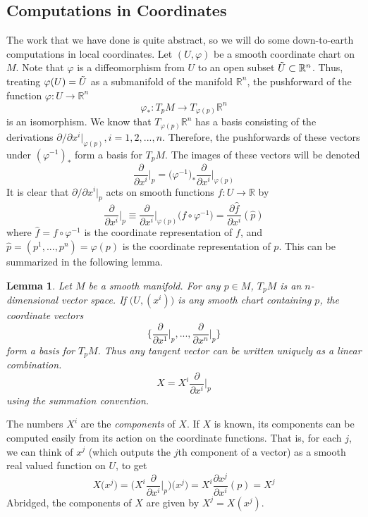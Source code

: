 \documentclass{article}
\newtheorem{lemma}[theorem]{Lemma}
\theoremstyle{remark}
\theoremstyle{definition}
\begin{document}
\subsection{Computations in Coordinates}
The work that we have done is quite abstract, so we will do some down-to-earth computations in local coordinates. Let $(U, \varphi)$ be a smooth coordinate chart on $M$. Note that $\varphi$ is a diffeomorphism from $U$ to an open subset $\Tilde{U} \subset \mathbb{R}^n$. Thus, treating $\varphi(U) = \Tilde{U}$ as a submanifold of the manifold $\mathbb{R}^n$, the pushforward of the function $\varphi: U \longrightarrow \mathbb{R}^n$
\[\varphi_* : T_p M \longrightarrow T_{\varphi(p)} \mathbb{R}^n\]
is an isomorphism. We know that $T_{\varphi(p)} \mathbb{R}^n$ has a basis consisting of the derivations $\partial /\partial x^i \big|_{\varphi(p)}, i = 1, 2, ..., n$. Therefore, the pushforwards of these vectors under $(\varphi^{-1})_*$ form a basis for $T_p M$. The images of these vectors will be denoted
\[\frac{\partial}{\partial x^i} \bigg|_p = \big( \varphi^{-1} \big)_* \frac{\partial}{\partial x^i} \bigg|_{\varphi(p)}\]
It is clear that $\partial / \partial x^i \big|_p $ acts on smooth functions $f: U \longrightarrow \mathbb{R}$ by
\[\frac{\partial}{\partial x^i} \bigg|_p \equiv \frac{\partial}{\partial x^i} \bigg|_{\varphi(p)} \big( f \circ \varphi^{-1} \big) = \frac{\partial \hat{f}}{\partial x^i} (\hat{p})\]
where $\hat{f} = f \circ \varphi^{-1}$ is the coordinate representation of $f$, and $\hat{p} = (p^1, ..., p^n) = \varphi(p)$ is the coordinate representation of $p$. This can be summarized in the following lemma. 

\begin{lemma}
Let $M$ be a smooth manifold. For any $p \in M$, $T_p M$ is an $n$-dimensional vector space. If $\big( U, (x^i)\big)$ is any smooth chart containing $p$, the coordinate vectors 
\[\bigg\{ \frac{\partial}{\partial x^1} \bigg|_p, ..., \frac{\partial}{\partial x^n} \bigg|_p \bigg\}\]
form a basis for $T_p M$. Thus any tangent vector can be written uniquely as a linear combination. 
\[X = X^i \frac{\partial}{\partial x^i} \bigg|_p\]
using the summation convention. 
\end{lemma}

The numbers $X^i$ are the \textit{components} of $X$. If $X$ is known, its components can be computed easily from its action on the coordinate functions. That is, for each $j$, we can think of $x^j$ (which outputs the $j$th component of a vector) as a smooth real valued function on $U$, to get
\[X \big(x^j\big) = \bigg(X^i \frac{\partial}{\partial x^i} \bigg|_p \bigg) \big(x^j \big) = X^i \frac{\partial x^j}{\partial x^i} (p) = X^j\]
Abridged, the components of $X$ are given by $X^j = X(x^j)$. 
\end{document}
